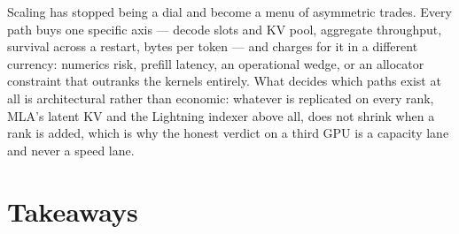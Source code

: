 Scaling has stopped being a dial and become a menu of asymmetric trades.
Every path buys one specific axis --- decode slots and KV pool, aggregate
throughput, survival across a restart, bytes per token --- and charges for
it in a different currency: numerics risk, prefill latency, an operational
wedge, or an allocator constraint that outranks the kernels entirely. What
decides which paths exist at all is architectural rather than economic:
whatever is replicated on every rank, MLA's latent KV and the Lightning
indexer above all, does not shrink when a rank is added, which is why the
honest verdict on a third GPU is a capacity lane and never a speed lane.

\FloatBarrier
\section*{Takeaways}


